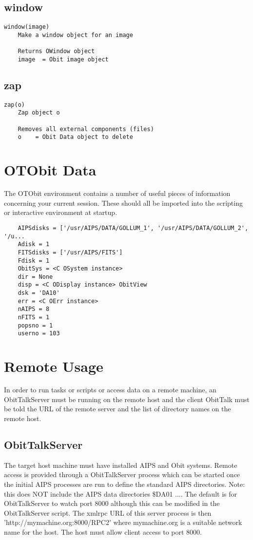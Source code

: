 \documentclass[11pt]{report}
\begin{document}
\subsection{window}
\begin{verbatim}
window(image)
    Make a window object for an image
    
    Returns OWindow object
    image  = Obit image object
\end{verbatim}

\subsection{zap}
\begin{verbatim}
zap(o)
    Zap object o
    
    Removes all external components (files)
    o    = Obit Data object to delete
\end{verbatim}

%

\section{OTObit Data}
The OTObit environment contains a number of useful pieces of
information concerning your current session.
These should all be imported into the scripting or interactive
environment at startup.
\begin{verbatim}
    AIPSdisks = ['/usr/AIPS/DATA/GOLLUM_1', '/usr/AIPS/DATA/GOLLUM_2', '/u...
    Adisk = 1
    FITSdisks = ['/usr/AIPS/FITS']
    Fdisk = 1
    ObitSys = <C OSystem instance>
    dir = None
    disp = <C ODisplay instance> ObitView
    dsk = 'DA10'
    err = <C OErr instance>
    nAIPS = 8
    nFITS = 1
    popsno = 1
    userno = 103
\end{verbatim}

\section{Remote Usage}
In order to run tasks or scripts or access data on a remote machine, 
an ObitTalkServer must be running on the remote host and the client
ObitTalk must be told the URL of the remote server and the list of
directory names on the remote host.

\subsection{ObitTalkServer}
The target host machine must have installed AIPS and Obit systems.
Remote access is provided through a ObitTalkServer process which can
be started once the initial AIPS processes are run to define the
standard AIPS directories.
Note: this does NOT include the AIPS data directories \$DA01 ....
The default is for ObitTalkServer to watch port 8000 although this can
be modified in the ObitTalkServer script.
The xmlrpc URL of this server process is then
'http://mymachine.org:8000/RPC2' where mymachine.org is a suitable
network name for the host.
The host must allow client access to port 8000.
\end{document}
